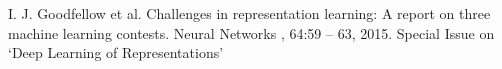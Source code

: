 \documentclass[twoside]{article}
\begin{document}
\begin{multicols}{2}
\begin{thebibliography}{9}
	I. J. Goodfellow et al.
	Challenges in representation learning: A report on three machine
	learning contests.
	Neural Networks
	, 64:59 – 63, 2015.
	Special Issue on ‘Deep Learning of Representations’
	

 
\end{thebibliography}


\end{multicols}
\end{document}

